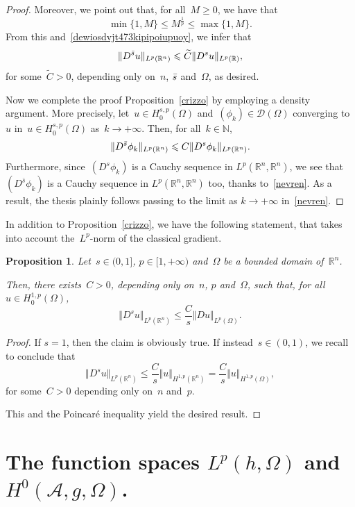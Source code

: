 \documentclass[11pt,hyp,]{nyjm}
\numberwithin{equation}{section}
\newcommand{\R}{\mathbb{R}}
\newcommand{\N}{\mathbb{N}}
\newtheorem{proposition}[theorem]{Proposition}
\theoremstyle{remark}
\newcommand{\am}{\mathcal{A}}
\newcommand{\bs}{\Bar{s}}
\renewcommand{\leq}{\leqslant}
\renewcommand{\le}{\leqslant}
\renewcommand{\ge}{\geqslant}
\begin{document}
\begin{proof}
Moreover, we point out that, for all~$M\ge0$, we have that
$$\min\{1,M\}\le M^{\frac1p}\le \max\{1,M\}.$$
{F}rom this and~\eqref{dewiosdvjt473kipipoiupuoy}, we infer that
$$ \Vert D^{\bs} u \Vert_{L^p(\R^n)}\le \widetilde C\Vert D^s u \Vert_{L^p(\R)},$$
for some~$\widetilde C>0$, depending only on~$n$, $\bs$ and~$\Omega$, as desired.
					
{N}ow we complete the proof Proposition~\ref{crizzo} by
employing a density argument. More precisely, let~$u \in H^{s,p}_0(\Omega)$ and~$(\phi_k)\in\mathcal{D}(\Omega)$ converging to~$u$ in~$u \in H^{s,p}_0(\Omega)$ as~$k\to+\infty$. Then, for all~$k\in\N$,
\begin{equation}\label{nevren}
				\Vert D^{\bs}\phi_k \Vert_{L^p(\R^n)} \leq C \Vert D^s \phi_k \Vert_{L^p(\R^n)}. 
\end{equation}
Furthermore, since~$(D^s \phi_k)$ is a Cauchy sequence in $L^p(\R^n, \R^n)$, we see that $(D^{\bar{s}}\phi_k)$ is a Cauchy sequence in $L^p(\R^n, \R^n)$ too,
thanks to~\eqref{nevren}.
As a result, the thesis plainly follows passing to the limit as $k \to +\infty$ in~\eqref{nevren}.
\end{proof}
		
In addition to Proposition~\ref{crizzo}, we have the following statement, that takes
into account the~$L^p$-norm of the classical gradient. 
		
		\begin{proposition} \label{capire}
		Let~$s \in (0,1]$, $p \in [1,+\infty)$ and~$\Omega$ be a bounded domain of~$\R^n$. 
			
			Then, there exists~$C>0$, depending only on~$n$, $p$ and~$\Omega$, such that, for all~$u \in  H_0^{1,p}(\Omega) $,
			\begin{equation*}
\Vert D^s u \Vert_{L^p(\R^n)} \leq \frac{C}{s} \Vert Du \Vert_{L^p(\Omega)}.
\end{equation*}
		\end{proposition}
		
		\begin{proof}
		If $s=1$, then the claim is obviously true.
		If instead~$s \in (0,1)$, we recall~\cite[Proposition~2.7]{mora} to conclude that $$ \Vert D^s u \Vert_{L^p(\R^n)} \leq \frac{C}{s} \Vert u \Vert_{H^{1,p}(\R^n)}=
\frac{C}{s} \Vert u \Vert_{H^{1,p}(\Omega)},$$
for some~$C>0$ depending only on~$n$ and~$p$.
			
This and the Poincar\'{e} inequality yield the desired result.
\end{proof}

\section{The function spaces $L^p(h, \Omega)$ and $H^{0}(\am, g, \Omega)$.}\label{ipo} 
\end{document}
